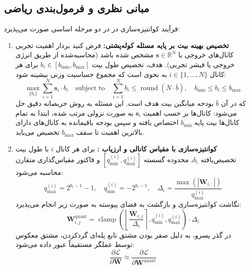 \subsection{مبانی نظری و فرمول‌بندی ریاضی}
فرآیند کوانتیزه‌سازی در  در دو مرحله اساسی صورت می‌پذیرد:
\begin{enumerate}
    \item \textbf{تخصیص بهینه بیت بر پایه مسئله کوله‌پشتی:} فرض کنید بردار اهمیت تجربی کانال‌های خروجی با $\mathbf{s} \in \mathbb{R}^N$ مشخص شده باشد (محاسبه‌شده از طریق انرژی خروجی یا فیشر تجربی). هدف، تخصیص طول بیت $b_i \in [b_{\text{min}}, b_{\text{max}}]$ برای هر کانال $i \in \{1, \dots, N\}$ به نحوی است که مجموع حساسیت وزنی بیشینه شود:
    \begin{equation}
    \max_{\{b_i\}} \sum_{i=1}^N \mathbf{s}_i \cdot b_i \quad \text{subject to} \quad \sum_{i=1}^N b_i \le \operatorname{round}(N \cdot \bar{b}), \quad b_{\text{min}} \le b_i \le b_{\text{max}}
    \end{equation}
    که در آن $\bar{b}$ بودجه میانگین بیت هدف است. این مسئله به روش حریصانه دقیق حل می‌شود: کانال‌ها بر حسب اهمیت $\mathbf{s}_i$ به صورت نزولی مرتب شده، ابتدا به تمام کانال‌ها بیت پایه $b_{\text{min}}$ اختصاص یافته و سپس بودجه باقیمانده به کانال‌های دارای بالاترین اهمیت تا سقف $b_{\text{max}}$ تخصیص می‌یابد.
    \item \textbf{کوانتیزه‌سازی با مقیاس کانالی و ارزیاب :} برای هر کانال $i$ با طول بیت تخصیص‌یافته $b_i$، محدوده گسسته $[q_{\text{min}}^{(i)}, q_{\text{max}}^{(i)}]$ و فاکتور مقیاس‌گذاری متقارن محاسبه می‌شود:
    \begin{equation}
    q_{\text{max}}^{(i)} = 2^{b_i - 1} - 1, \quad q_{\text{min}}^{(i)} = -2^{b_i - 1}, \quad \Delta_i = \frac{\max(|\mathbf{W}_{i, :}|)}{q_{\text{max}}^{(i)}}
    \end{equation}
    نگاشت کوانتیزه‌سازی و بازگشت به فضای پیوسته به صورت زیر انجام می‌پذیرد:
    \begin{equation}
    \mathbf{W}_{i, j}^{\text{quant}} = \operatorname{clamp}\left(\left\lfloor \frac{\mathbf{W}_{i, j}}{\Delta_i} \right\rceil, q_{\text{min}}^{(i)}, q_{\text{max}}^{(i)}\right) \cdot \Delta_i
    \end{equation}
    در گذر پسرو، به دلیل صفر بودن مشتق تابع پله‌ای گردکردن، مشتق معکوس توسط عملگر  مستقیماً عبور داده می‌شود:
    \begin{equation}
    \frac{\partial \mathcal{L}}{\partial \mathbf{W}} \approx \frac{\partial \mathcal{L}}{\partial \mathbf{W}^{\text{quant}}}
    \end{equation}
\end{enumerate}

